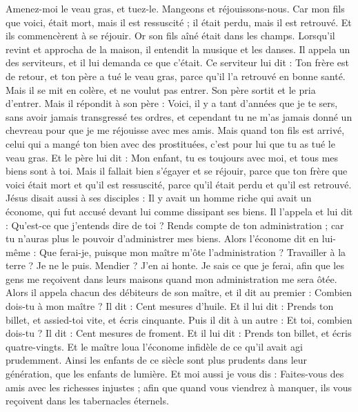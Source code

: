 \begin{multicols}{2}
Amenez-moi le veau gras, et tuez-le. Mangeons et réjouissons-nous.
Car mon fils que voici, était mort, mais il est ressuscité ; il était perdu, mais il est retrouvé. Et ils commencèrent à se réjouir.
Or son fils aîné était dans les champs. Lorsqu'il revint et approcha de la maison, il entendit la musique et les danses.
Il appela un des serviteurs, et il lui demanda ce que c'était.
Ce serviteur lui dit : Ton frère est de retour, et ton père a tué le veau gras, parce qu'il l'a retrouvé en bonne santé.
Mais il se mit en colère, et ne voulut pas entrer. Son père sortit et le pria d'entrer.
Mais il répondit à son père : Voici, il y a tant d'années que je te sers, sans avoir jamais transgressé tes ordres, et cependant tu ne m'as jamais donné un chevreau pour que je me réjouisse avec mes amis.
Mais quand ton fils est arrivé, celui qui a mangé ton bien avec des prostituées, c'est pour lui que tu as tué le veau gras.
Et le père lui dit : Mon enfant, tu es toujours avec moi, et tous mes biens sont à toi.
Mais il fallait bien s'égayer et se réjouir, parce que ton frère que voici était mort et qu'il est ressuscité, parce qu'il était perdu et qu'il est retrouvé.
\VerseOne{}Jésus disait aussi à ses disciples : Il y avait un homme riche qui avait un économe, qui fut accusé devant lui comme dissipant ses biens.
Il l'appela et lui dit : Qu'est-ce que j'entends dire de toi ? Rends compte de ton administration ; car tu n'auras plus le pouvoir d'administrer mes biens.
Alors l'économe dit en lui-même : Que ferai-je, puisque mon maître m'ôte l'administration ? Travailler à la terre ? Je ne le puis. Mendier ? J'en ai honte.
Je sais ce que je ferai, afin que les gens me reçoivent dans leurs maisons quand mon administration me sera ôtée.
Alors il appela chacun des débiteurs de son maître, et il dit au premier : Combien dois-tu à mon maître ?
Il dit : Cent mesures d'huile. Et il lui dit : Prends ton billet, et assied-toi vite, et écris cinquante.
Puis il dit à un autre : Et toi, combien dois-tu ? Il dit : Cent mesures de froment. Et il lui dit : Prends ton billet, et écris quatre-vingts.
Et le maître loua l'économe infidèle de ce qu'il avait agi prudemment. Ainsi les enfants de ce siècle sont plus prudents dans leur génération, que les enfants de lumière.
Et moi aussi je vous dis : Faites-vous des amis avec les richesses injustes ; afin que quand vous viendrez à manquer, ils vous reçoivent dans les tabernacles éternels.

\end{multicols}

